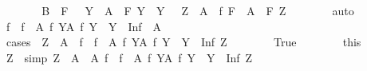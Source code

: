 \begin{isabellebody}
\ \ \ \ \isamarkupfalse%
\ \isamarkupfalse%
\ B{\isacharcolon}{\kern0pt}\ {\isachardoublequoteopen}{\isasymAnd}\ F\ {\isachardot}{\kern0pt}\ {\isacharparenleft}{\kern0pt}{\isasymforall}\ Y\ {\isasymin}\ A\ {\isachardot}{\kern0pt}\ F\ Y\ {\isasymin}\ Y{\isacharparenright}{\kern0pt}\ {\isasymLongrightarrow}\ {\isasymexists}\ Z\ {\isasymin}\ A\ {\isachardot}{\kern0pt}\ f\ {\isacharparenleft}{\kern0pt}F\ {\isacharbackquote}{\kern0pt}\ A{\isacharparenright}{\kern0pt}\ {\isacharequal}{\kern0pt}\ F\ Z{\isachardoublequoteclose}\isanewline
\ \ \ \ \ \ \isamarkupfalse%
\ auto\isanewline
\ \ \ \ \isamarkupfalse%
\ {\isachardoublequoteopen}{\isasymSqinter}{\isacharparenleft}{\kern0pt}f\ {\isacharbackquote}{\kern0pt}\ {\isacharbraceleft}{\kern0pt}f\ {\isacharbackquote}{\kern0pt}\ A\ {\isacharbar}{\kern0pt}f{\isachardot}{\kern0pt}\ {\isasymforall}Y{\isasymin}A{\isachardot}{\kern0pt}\ f\ Y\ {\isasymin}\ Y{\isacharbraceright}{\kern0pt}{\isacharparenright}{\kern0pt}\ {\isasymle}\ {\isasymSqunion}{\isacharparenleft}{\kern0pt}Inf\ {\isacharbackquote}{\kern0pt}\ A{\isacharparenright}{\kern0pt}{\isachardoublequoteclose}\isanewline
\ \ \ \ \isamarkupfalse%
\ {\isacharparenleft}{\kern0pt}cases\ {\isachardoublequoteopen}{\isasymexists}\ Z\ {\isasymin}\ A\ {\isachardot}{\kern0pt}\ {\isasymSqinter}{\isacharparenleft}{\kern0pt}f\ {\isacharbackquote}{\kern0pt}\ {\isacharbraceleft}{\kern0pt}f\ {\isacharbackquote}{\kern0pt}\ A\ {\isacharbar}{\kern0pt}f{\isachardot}{\kern0pt}\ {\isasymforall}Y{\isasymin}A{\isachardot}{\kern0pt}\ f\ Y\ {\isasymin}\ Y{\isacharbraceright}{\kern0pt}{\isacharparenright}{\kern0pt}\ {\isasymle}\ Inf\ Z{\isachardoublequoteclose}{\isacharparenright}{\kern0pt}\isanewline
\ \ \ \ \ \ \isamarkupfalse%
\ True\isanewline
\ \ \ \ \ \ \isamarkupfalse%
\ this\ \isamarkupfalse%
\ Z\ \ {\isacharbrackleft}{\kern0pt}simp{\isacharbrackright}{\kern0pt}{\isacharcolon}{\kern0pt}\ {\isachardoublequoteopen}Z\ {\isasymin}\ A{\isachardoublequoteclose}\ \ A{\isacharcolon}{\kern0pt}\ {\isachardoublequoteopen}{\isasymSqinter}{\isacharparenleft}{\kern0pt}f\ {\isacharbackquote}{\kern0pt}\ {\isacharbraceleft}{\kern0pt}f\ {\isacharbackquote}{\kern0pt}\ A\ {\isacharbar}{\kern0pt}f{\isachardot}{\kern0pt}\ {\isasymforall}Y{\isasymin}A{\isachardot}{\kern0pt}\ f\ Y\ {\isasymin}\ Y{\isacharbraceright}{\kern0pt}{\isacharparenright}{\kern0pt}\ {\isasymle}\ Inf\ Z{\isachardoublequoteclose}\isanewline
\ \ \ \ \ \ \ \ \isamarkupfalse%

\end{isabellebody}
